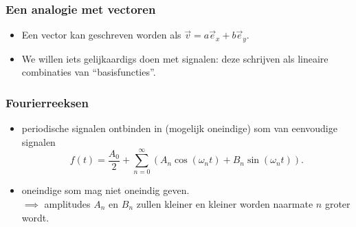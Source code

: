 \documentclass[compress, darktitle, framenumber]{beamer}
\newcommand{\brac}[1]{\left( #1 \right)} %
\begin{document}
\begin{frame}[fragile]
\frametitle{Een analogie met vectoren}
\begin{itemize}
\item Een vector kan geschreven worden als $\vec{v}=a\vec{e}_x+b\vec{e}_y.$
\end{itemize}
\begin{center}
\end{center}
\begin{itemize}
\item We willen iets gelijkaardigs doen met signalen: deze schrijven als lineaire combinaties van ``basisfuncties''.
\end{itemize}
\end{frame}

\begin{frame}
\frametitle{Fourierreeksen}
\begin{itemize}
\item periodische signalen ontbinden in (mogelijk oneindige) som van eenvoudige signalen 
$$f(t)=\frac{A_0}{2}+\sum_{n=0}^{\infty}\brac{A_n \cos(\omega_n t)+B_n\sin(\omega_n t)}. $$
\item oneindige som mag niet oneindig geven. \\ \noindent 
$\implies$ amplitudes $A_n$ en $B_n$ zullen kleiner en kleiner worden naarmate $n$ groter wordt. 
\end{itemize}
\end{frame}
\end{document}
